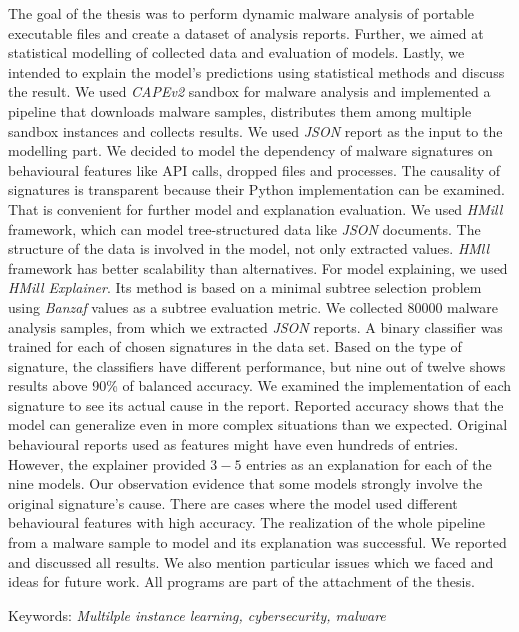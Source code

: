 \documentclass[11pt,twoside,a4paper]{book}
\begin{document}
	\abstractpage
The goal of the thesis was to perform dynamic malware analysis of portable executable files and create a dataset of analysis reports. Further, we aimed at statistical modelling of collected data and evaluation of models. Lastly, we intended to explain the model's predictions using statistical methods and discuss the result. We used \emph{CAPEv2} sandbox for malware analysis and implemented a pipeline that downloads malware samples, distributes them among multiple sandbox instances and collects results. We used \emph{JSON} report as the input to the modelling part. We decided to model the dependency of malware signatures on behavioural features like API calls, dropped files and processes. The causality of signatures is transparent because their Python implementation can be examined. That is convenient for further model and explanation evaluation. We used \emph{HMill} framework, which can model tree-structured data like \emph{JSON} documents. The structure of the data is involved in the model, not only extracted values. \emph{HMll} framework has better scalability than alternatives. For model explaining, we used \emph{HMill Explainer}. Its method is based on a minimal subtree selection problem using \emph{Banzaf} values as a subtree evaluation metric. We collected $80000$ malware analysis samples, from which we extracted \emph{JSON} reports. A binary classifier was trained for each of chosen signatures in the data set. Based on the type of signature, the classifiers have different performance, but nine out of twelve shows results above 90\% of balanced accuracy. We examined the implementation of each signature to see its actual cause in the report. Reported accuracy shows that the model can generalize even in more complex situations than we expected. Original behavioural reports used as features might have even hundreds of entries. However, the explainer provided $3-5$ entries as an explanation for each of the nine models. Our observation evidence that some models strongly involve the original signature's cause. There are cases where the model used different behavioural features with high accuracy. The realization of the whole pipeline from a malware sample to model and its explanation was successful. We reported and discussed all results. We also mention particular issues which we faced and ideas for future work. All programs are part of the attachment of the thesis. \
	
	\vspace{5mm}

	\noindent Keywords: \emph{Multilple instance learning, cybersecurity, malware}
\end{document}
